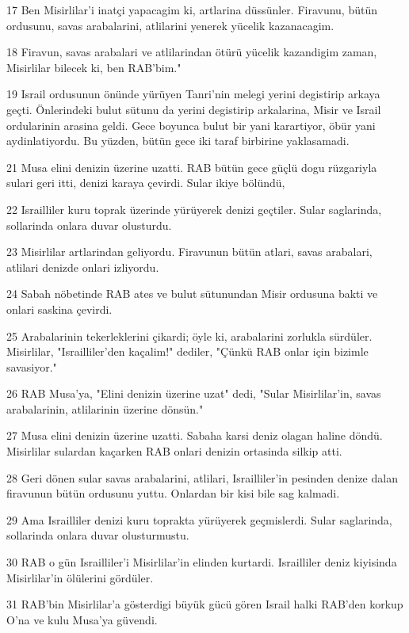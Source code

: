 \par 17 Ben Misirlilar'i inatçi yapacagim ki, artlarina düssünler. Firavunu, bütün ordusunu, savas arabalarini, atlilarini yenerek yücelik kazanacagim.
\par 18 Firavun, savas arabalari ve atlilarindan ötürü yücelik kazandigim zaman, Misirlilar bilecek ki, ben RAB'bim."
\par 19 Israil ordusunun önünde yürüyen Tanri'nin melegi yerini degistirip arkaya geçti. Önlerindeki bulut sütunu da yerini degistirip arkalarina, Misir ve Israil ordularinin arasina geldi. Gece boyunca bulut bir yani karartiyor, öbür yani aydinlatiyordu. Bu yüzden, bütün gece iki taraf birbirine yaklasamadi.
\par 21 Musa elini denizin üzerine uzatti. RAB bütün gece güçlü dogu rüzgariyla sulari geri itti, denizi karaya çevirdi. Sular ikiye bölündü,
\par 22 Israilliler kuru toprak üzerinde yürüyerek denizi geçtiler. Sular saglarinda, sollarinda onlara duvar olusturdu.
\par 23 Misirlilar artlarindan geliyordu. Firavunun bütün atlari, savas arabalari, atlilari denizde onlari izliyordu.
\par 24 Sabah nöbetinde RAB ates ve bulut sütunundan Misir ordusuna bakti ve onlari saskina çevirdi.
\par 25 Arabalarinin tekerleklerini çikardi; öyle ki, arabalarini zorlukla sürdüler. Misirlilar, "Israilliler'den kaçalim!" dediler, "Çünkü RAB onlar için bizimle savasiyor."
\par 26 RAB Musa'ya, "Elini denizin üzerine uzat" dedi, "Sular Misirlilar'in, savas arabalarinin, atlilarinin üzerine dönsün."
\par 27 Musa elini denizin üzerine uzatti. Sabaha karsi deniz olagan haline döndü. Misirlilar sulardan kaçarken RAB onlari denizin ortasinda silkip atti.
\par 28 Geri dönen sular savas arabalarini, atlilari, Israilliler'in pesinden denize dalan firavunun bütün ordusunu yuttu. Onlardan bir kisi bile sag kalmadi.
\par 29 Ama Israilliler denizi kuru toprakta yürüyerek geçmislerdi. Sular saglarinda, sollarinda onlara duvar olusturmustu.
\par 30 RAB o gün Israilliler'i Misirlilar'in elinden kurtardi. Israilliler deniz kiyisinda Misirlilar'in ölülerini gördüler.
\par 31 RAB'bin Misirlilar'a gösterdigi büyük gücü gören Israil halki RAB'den korkup O'na ve kulu Musa'ya güvendi.

